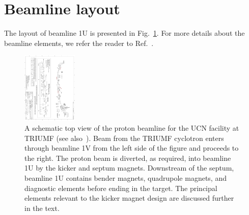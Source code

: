 \documentclass[aps,prab,twocolumn,superscriptaddress]{revtex4-1}
\begin{document}
\section{Beamline layout}

The layout of beamline 1U is presented in Fig.~\ref{fig:1VUAschematic}.  For more details about the beamline elements, we refer the reader to Ref.~\cite{AHMED2019101}.

\begin{figure}
	\includegraphics[trim=11mm 0 0 15.6cm,clip=true,angle=90,height=3.39cm]{BL1Uupstreamv4.pdf}
	\hspace{1mm}
\caption{A schematic top view of the proton beamline for the UCN facility at TRIUMF (see also~\cite{AHMED2019101}).  Beam from the TRIUMF cyclotron enters through beamline 1V from the left side of the figure and proceeds to the right.  The proton beam is diverted, as required, into beamline 1U by the kicker and septum magnets.  Downstream of the septum, beamline 1U contains bender magnets, quadrupole magnets, and diagnostic elements before ending in the target.  The principal elements relevant to the kicker magnet design are discussed further in the text.
    \label{fig:1VUAschematic}}
\end{figure}

\end{document}

